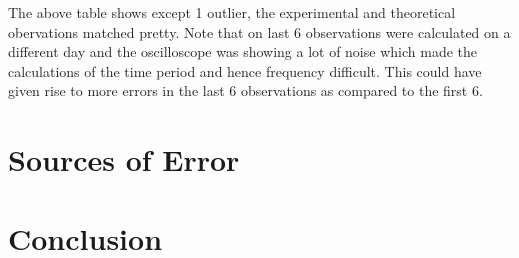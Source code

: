 \documentclass[12pt]{article}
\begin{document}
\noindent
The above table shows except 1 outlier, the experimental and theoretical obervations matched pretty. Note that on last 6 observations were calculated on a different day and the oscilloscope was showing a lot of noise which made the calculations of the time period and hence frequency difficult. This could have given rise to more errors in the last 6 observations as compared to the first 6.

\section{Sources of Error}

\section{Conclusion}
\end{document}
